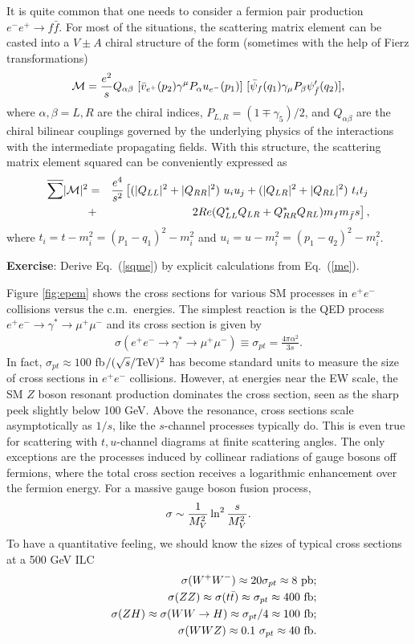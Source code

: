 \documentclass[12pt,prd,aps,floats,preprintnumbers,preprint,superscriptaddress,floatfix,nofootinbib]{revtex4}
\def\cM{{\cal M}}
\def\epem{e^+e^-}
\def\pb{{\rm pb}}
\def\fb{{\rm fb}}
\def\be{\begin{equation}}
\def\ee{\end{equation}}
\def\bea{\begin{eqnarray}}
\def\eea{\end{eqnarray}}
\begin{document}
It is quite common that one needs to consider a fermion pair production
$e^-e^+\to f\bar f$. For most of the situations, the scattering matrix element
can be casted into a $V\pm A$ chiral structure of the form (sometimes with
the help of Fierz transformations)
\bea
\cM = {e^2 \over s} Q_{\alpha\beta}\ 
[\bar v_{e^+}(p_2) \gamma^\mu P_\alpha u_{e^-}(p_1)]\ 
   [\bar \psi_f(q_1) \gamma_\mu P_\beta \psi'_{\bar f}(q_2)],
\label{me}
\eea
where $\alpha, \beta=L, R$ are the  chiral indices, $P_{L,R}^{}=(1\mp \gamma_5)/2$, 
and $Q_{\alpha\beta}$ are the chiral bilinear couplings governed by the underlying
physics of the interactions with the intermediate propagating fields. With this
structure, the  scattering matrix element squared can be conveniently
expressed as
\bea 
\nonumber
\overline{ \sum} |\cM|^2 &=& {e^4 \over s^2} \left[
( |Q_{LL}|^2 + |Q_{RR}|^2 )\ u_i u_j +
( |Q_{LR}|^2 + |Q_{RL}|^2 )\ t_i t_j  \right.  \\
&+& \left. 2Re ( Q_{LL}^* Q_{LR} + Q_{RR}^*Q_{RL} ) m_f m_{\bar f} s \right],
\label{sqme}
\eea
where $t_i=t-m_i^2=(p_1-q_1)^2-m_i^2$ and $u_i=u-m_i^2=(p_1-q_2)^2-m_i^2$.

{
\vskip 0.2cm
\noindent
{\bf Exercise}: Derive Eq.~(\ref{sqme}) by explicit calculations
from Eq.~(\ref{me}).
\vskip 0.2cm
}

Figure \ref{fig:epem} shows the cross sections for various SM processes
in $\epem$ collisions versus the c.m.~energies. 
The simplest reaction  is the QED process 
$e^+e^-\to\gamma^*\to \mu^+\mu^-$ and its cross section is given by
\bea
{\sigma(e^+e^-\to \gamma^*\to \mu^+\mu^-)\equiv \sigma_{pt}= \frac{4\pi\alpha^2}{3 s}  }.
\eea
In fact, $\sigma_{pt}\approx 100$ fb$/(\sqrt s/{\rm TeV})^2$ 
has become  standard units to measure the size of cross sections
in $e^+e^-$ collisions. However, at energies near the EW scale,  the SM $Z$ boson resonant
production dominates the cross section, seen  as the sharp peek 
slightly below 100 GeV. Above
the resonance, cross sections scale asymptotically as $1/s$, like the 
$s$-channel processes typically do. This is even true for scattering 
with $t,u$-channel diagrams at finite scattering angles. 
The only exceptions are the processes induced by collinear radiations of gauge
bosons off fermions, 
where the total cross section receives a logarithmic enhancement over the 
fermion energy.  For a massive gauge boson fusion process,
\be
\sigma \sim {1\over M^2_V}\ln^2{s\over M_V^2}.
\ee
To have a quantitative feeling, we should know the sizes of typical cross sections
at a 500 GeV ILC
\bea
\nonumber
&&\sigma(W^+W^-) \approx 20\sigma_{pt} \approx 8\ \pb;\\
\nonumber
&&\sigma(ZZ) \approx \sigma(t\bar t) \approx \sigma_{pt} \approx 400\ \fb;\\
\nonumber
&&\sigma(ZH) \approx \sigma(WW\to H) \approx \sigma_{pt}/4 \approx 100\ \fb;\\
\nonumber
&& \sigma(WWZ) \approx 0.1\ \sigma_{pt} \approx 40\ \fb.
\eea
\end{document}
